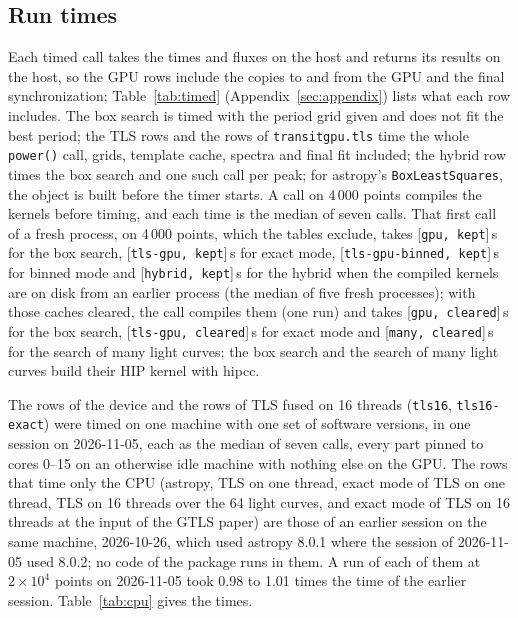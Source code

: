 \documentclass{aastex631}
\providecommand{\Cold}[2]{[\texttt{#1, #2}]}
\begin{document}
\subsection{Run times}\label{sec:time}
Each timed call takes the times and fluxes on the host and returns its results on the host, so the GPU rows include the copies to and from the GPU and the final synchronization; Table~\ref{tab:timed} (Appendix~\ref{sec:appendix}) lists what each row includes. The box search is timed with the period grid given and does not fit the best period; the TLS rows and the rows of \texttt{transitgpu.tls} time the whole \texttt{power()} call, grids, template cache, spectra and final fit included; the hybrid row times the box search and one such call per peak; for astropy's \texttt{BoxLeastSquares}, the object is built before the timer starts. A call on 4\,000 points compiles the kernels before timing, and each time is the median of seven calls. That first call of a fresh process, on 4\,000 points, which the tables exclude, takes \Cold{gpu}{kept}\,s for the box search, \Cold{tls-gpu}{kept}\,s for exact mode, \Cold{tls-gpu-binned}{kept}\,s for binned mode and \Cold{hybrid}{kept}\,s for the hybrid when the compiled kernels are on disk from an earlier process (the median of five fresh processes); with those caches cleared, the call compiles them (one run) and takes \Cold{gpu}{cleared}\,s for the box search, \Cold{tls-gpu}{cleared}\,s for exact mode and \Cold{many}{cleared}\,s for the search of many light curves; the box search and the search of many light curves build their HIP kernel with hipcc.


The rows of the device and the rows of TLS fused on 16 threads (\texttt{tls16}, \texttt{tls16-exact}) were timed on one machine with one set of software versions, in one session on 2026-11-05, each as the median of seven calls, every part pinned to cores 0--15 on an otherwise idle machine with nothing else on the GPU. The rows that time only the CPU (astropy, TLS on one thread, exact mode of TLS on one thread, TLS on 16 threads over the 64 light curves, and exact mode of TLS on 16 threads at the input of the GTLS paper) are those of an earlier session on the same machine, 2026-10-26, which used astropy 8.0.1 where the session of 2026-11-05 used 8.0.2; no code of the package runs in them. A run of each of them at $2\times10^4$ points on 2026-11-05 took 0.98 to 1.01 times the time of the earlier session. Table~\ref{tab:cpu} gives the times.
\end{document}
